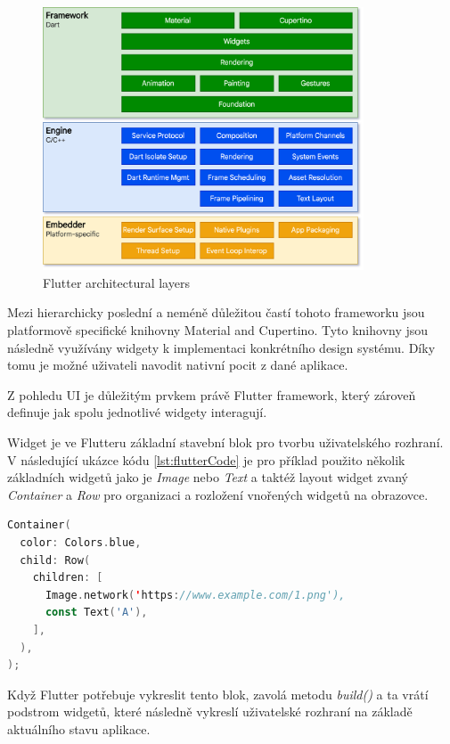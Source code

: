 \begin{figure}[H]
  \centering
  \includegraphics[width=0.85\textwidth]{flutter_architectural_layers.png}
  \caption{Flutter architectural layers}
  \label{fig:flutter_architectural_layers}
\end{figure}

Mezi hierarchicky poslední a neméně důležitou častí tohoto frameworku jsou platformově specifické knihovny Material and Cupertino. Tyto knihovny
jsou následně využívány widgety k implementaci konkrétního design systému. Díky tomu je možné uživateli navodit nativní pocit z dané aplikace.

\medskip

Z pohledu UI je důležitým prvkem právě Flutter framework, který zároveň definuje jak spolu jednotlivé widgety interagují.

Widget je ve Flutteru základní stavební blok pro tvorbu uživatelského rozhraní. \cite{flutterWidgets} V následující ukázce kódu \ref{lst:flutterCode} je pro příklad použito několik 
základních widgetů jako je \emph{Image} nebo \emph{Text} a taktéž layout widget zvaný \emph{Container} a \emph{Row} pro organizaci a 
rozložení vnořených widgetů na obrazovce.

\begin{lstlisting}[caption={Popis UI widgetů pomocí jazyka Dart}, label={lst:flutterCode}, language=Kotlin]
  Container(
  color: Colors.blue,
  child: Row(
    children: [
      Image.network('https://www.example.com/1.png'),
      const Text('A'),
    ],
  ),
);
\end{lstlisting}

Když Flutter potřebuje vykreslit tento blok, zavolá metodu \emph{build()} a ta vrátí podstrom widgetů, které následně vykreslí uživatelské 
rozhraní na základě aktuálního stavu aplikace. \cite*{flutterArchOverview}

